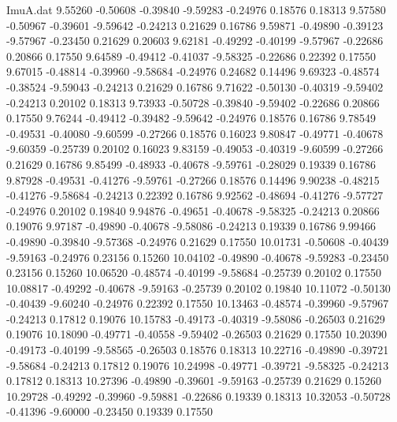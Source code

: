 \begin{filecontents}{ImuA.dat}
   9.55260   -0.50608   -0.39840   -9.59283   -0.24976    0.18576    0.18313
   9.57580   -0.50967   -0.39601   -9.59642   -0.24213    0.21629    0.16786
   9.59871   -0.49890   -0.39123   -9.57967   -0.23450    0.21629    0.20603
   9.62181   -0.49292   -0.40199   -9.57967   -0.22686    0.20866    0.17550
   9.64589   -0.49412   -0.41037   -9.58325   -0.22686    0.22392    0.17550
   9.67015   -0.48814   -0.39960   -9.58684   -0.24976    0.24682    0.14496
   9.69323   -0.48574   -0.38524   -9.59043   -0.24213    0.21629    0.16786
   9.71622   -0.50130   -0.40319   -9.59402   -0.24213    0.20102    0.18313
   9.73933   -0.50728   -0.39840   -9.59402   -0.22686    0.20866    0.17550
   9.76244   -0.49412   -0.39482   -9.59642   -0.24976    0.18576    0.16786
   9.78549   -0.49531   -0.40080   -9.60599   -0.27266    0.18576    0.16023
   9.80847   -0.49771   -0.40678   -9.60359   -0.25739    0.20102    0.16023
   9.83159   -0.49053   -0.40319   -9.60599   -0.27266    0.21629    0.16786
   9.85499   -0.48933   -0.40678   -9.59761   -0.28029    0.19339    0.16786
   9.87928   -0.49531   -0.41276   -9.59761   -0.27266    0.18576    0.14496
   9.90238   -0.48215   -0.41276   -9.58684   -0.24213    0.22392    0.16786
   9.92562   -0.48694   -0.41276   -9.57727   -0.24976    0.20102    0.19840
   9.94876   -0.49651   -0.40678   -9.58325   -0.24213    0.20866    0.19076
   9.97187   -0.49890   -0.40678   -9.58086   -0.24213    0.19339    0.16786
   9.99466   -0.49890   -0.39840   -9.57368   -0.24976    0.21629    0.17550
  10.01731   -0.50608   -0.40439   -9.59163   -0.24976    0.23156    0.15260
  10.04102   -0.49890   -0.40678   -9.59283   -0.23450    0.23156    0.15260
  10.06520   -0.48574   -0.40199   -9.58684   -0.25739    0.20102    0.17550
  10.08817   -0.49292   -0.40678   -9.59163   -0.25739    0.20102    0.19840
  10.11072   -0.50130   -0.40439   -9.60240   -0.24976    0.22392    0.17550
  10.13463   -0.48574   -0.39960   -9.57967   -0.24213    0.17812    0.19076
  10.15783   -0.49173   -0.40319   -9.58086   -0.26503    0.21629    0.19076
  10.18090   -0.49771   -0.40558   -9.59402   -0.26503    0.21629    0.17550
  10.20390   -0.49173   -0.40199   -9.58565   -0.26503    0.18576    0.18313
  10.22716   -0.49890   -0.39721   -9.58684   -0.24213    0.17812    0.19076
  10.24998   -0.49771   -0.39721   -9.58325   -0.24213    0.17812    0.18313
  10.27396   -0.49890   -0.39601   -9.59163   -0.25739    0.21629    0.15260
  10.29728   -0.49292   -0.39960   -9.59881   -0.22686    0.19339    0.18313
  10.32053   -0.50728   -0.41396   -9.60000   -0.23450    0.19339    0.17550

\end{filecontents}
